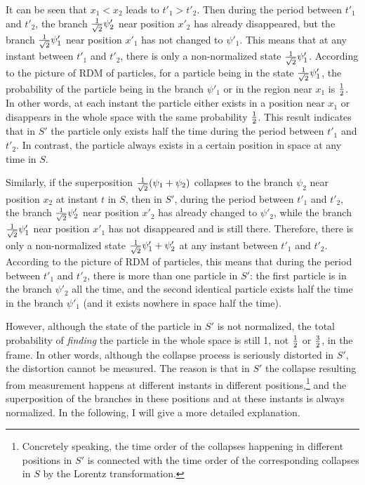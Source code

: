 \noindent It can be seen that $x_1<x_2$ leads to $t'_1>t'_2$. Then during the period between $t'_1$ and $t'_2$, the branch ${1 \over \sqrt{2}}\psi'_2$ near position $x'_2$ has already disappeared, but the branch ${1 \over \sqrt{2}}\psi'_1$  near position $x'_1$ has not changed to $\psi'_1$. This means that at any instant between $t'_1$ and $t'_2$, there is only a non-normalized state ${1 \over \sqrt{2}}\psi'_1$. According to the picture of  RDM of particles, for a particle being in the state ${1 \over \sqrt{2}}\psi'_1$, the probability of the particle being in the branch $\psi'_1$ or in the region near $x_1$ is $1 \over 2$. 
In other words, at each instant the particle either exists in a position near $x_1$ or disappears in the whole space with the same probability $1 \over 2$. This result indicates that in $S'$ the particle only exists half the time during the period between $t'_1$ and $t'_2$. In contrast, the particle always exists in a certain position in space at any time in $S$.

Similarly, if the superposition ${1 \over \sqrt{2}}(\psi_1+\psi_2)$  collapses to the branch $\psi_2$ near position $x_2$ at instant $t$ in $S$, then in $S'$, during the period between $t'_1$ and $t'_2$, the branch ${1 \over \sqrt{2}}\psi'_2$ near position $x'_2$ has already changed to $\psi'_2$, while the branch ${1 \over \sqrt{2}}\psi'_1$ near position $x'_1$ has not disappeared and is still there. Therefore, there is only a non-normalized state ${1 \over \sqrt{2}}\psi'_1+\psi'_2$ at any instant between $t'_1$ and $t'_2$. According to the picture of RDM of particles, this means that during the period between $t'_1$ and $t'_2$, there is more than one particle in $S'$: the first particle is in the branch $\psi'_2$ all the time, and the second identical particle exists half the time in the branch $\psi'_1$ (and it exists nowhere in space half the time).

However, although the state of the particle in $S'$ is not normalized, the total probability of \emph{finding} the particle in the whole space is still 1, not $1 \over 2$ or $3 \over 2$, in the frame. In other words, although the collapse process is seriously distorted in $S'$, the distortion  cannot be measured. The reason is that in $S'$ the collapse resulting from measurement happens at different instants in different positions,\footnote{Concretely speaking, the time order of the collapses happening in different positions in $S'$ is connected with the time order of the corresponding collapses in $S$ by the Lorentz transformation.} and the superposition of the branches in these positions and at these instants is always normalized. In the following, I will give a more detailed explanation.

